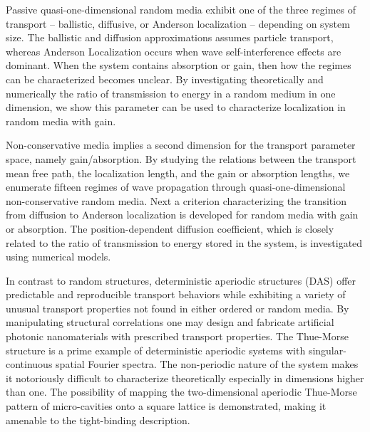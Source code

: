 \begin{spacing}{1.55}
Passive quasi-one-dimensional random media exhibit one of the three regimes of transport -- ballistic, diffusive, or Anderson localization -- depending on system size. The ballistic and diffusion approximations assumes particle transport, whereas Anderson Localization occurs when wave self-interference effects are dominant. When the system contains absorption or gain, then how the regimes can be characterized becomes unclear. By investigating theoretically and numerically the ratio of transmission to energy in a random medium in one dimension, we show this parameter can be used to characterize localization in random media with gain. 

Non-conservative media implies a second dimension for the transport parameter space, namely gain/absorption. By studying the relations between the transport mean free path, the localization length, and the gain or absorption lengths, we enumerate fifteen regimes of wave propagation through quasi-one-dimensional non-conservative random media. Next a criterion characterizing the transition from diffusion to Anderson localization is developed for random media with gain or absorption. The position-dependent diffusion coefficient, which is closely related to the ratio of transmission to energy stored in the system, is investigated using numerical models.

In contrast to random structures, deterministic aperiodic structures (DAS) offer predictable and reproducible transport behaviors while exhibiting a variety of unusual transport properties not found in either ordered or random media. By manipulating structural correlations one may design and fabricate artificial photonic nanomaterials with prescribed transport properties. 
The Thue-Morse structure is a prime example of deterministic aperiodic systems with singular-continuous spatial Fourier spectra. 
The non-periodic nature of the system makes it notoriously difficult to characterize theoretically especially in dimensions higher than one.  The possibility of mapping the two-dimensional aperiodic Thue-Morse pattern of micro-cavities onto a square lattice is demonstrated, making it amenable to the tight-binding description. 

\end{spacing}

